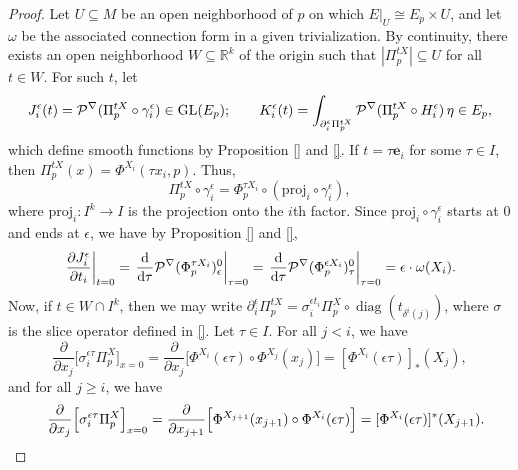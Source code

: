 \begin{proof}
  Let $U \subseteq M$ be an open neighborhood of $p$ on which $E|_U \cong E_p \times U$, and let $\omega$ be the associated connection form in a given trivialization. By continuity, there exists an open neighborhood $W \subseteq \mathbb{R}^k$ of the origin such that $|\Pi^{tX}_p| \subseteq U$ for all $t \in W$. For such $t$, let 
  \begin{equation}
  J_i^\epsilon(t) = \mathcal{P}^\nabla (\Pi^{tX}_p \circ \gamma_i^\epsilon) \in \operatorname{GL}(E_p); \quad \quad K_i^\epsilon(t) = \int_{\partial_i^\epsilon \Pi^{tX}_p} \mathcal{P}^\nabla(\Pi^{tX}_p \circ H_i^\epsilon)\, \eta \in E_p,
  \end{equation}
  which define smooth functions by Proposition \ref{} and \ref{}. If $t = \tau \mathbf{e}_i$ for some $\tau \in I$, then $\Pi^{tX}_p(x) = \Phi^{X_i}(\tau x_i, p)$. Thus,
  \begin{equation}
    \Pi^{tX}_p \circ \gamma_i^\epsilon = \Phi^{\tau X_i}_p \circ  (\mathrm{proj}_i \circ \gamma_i^\epsilon),
  \end{equation}
  where $\mathrm{proj}_i \colon I^k \to I$ is the projection onto the $i$th factor. Since $\mathrm{proj}_i \circ \gamma_i^\epsilon$ starts at $0$ and ends at $\epsilon$, we have by Proposition \ref{} and \ref{},
  \begin{equation}
    \left. \frac{\partial J_i^\epsilon}{\partial t_i} \right|_{t = 0} = \left.\frac{{\rm d}}{{\rm d} \tau} \mathcal{P}^\nabla(\Phi_p^{\tau X_i})_\epsilon^0 \right|_{\tau = 0} = \left.\frac{{\rm d}}{{\rm d} \tau} \mathcal{P}^\nabla(\Phi_p^{\epsilon X_i})_{\tau}^0 \right|_{\tau = 0} = \epsilon \cdot \omega(X_i).
  \end{equation}
  Now, if $t \in W \cap I^k$, then we may write $\partial_i^\epsilon \Pi^{tX}_p = \sigma_i^{\epsilon t_i} \Pi^X_p \circ \operatorname{diag}(t_{\delta^i(j)})$, where $\sigma$ is the slice operator defined in \eqref{}. Let $\tau \in I$. For all $j < i$, we have
  \begin{equation}
    \frac{\partial }{\partial x_j} \Big[ \sigma_i^{\epsilon\tau} \Pi^X_p \Big]_{x = 0} = \frac{\partial}{\partial x_j} \Big[\Phi^{X_i}(\epsilon\tau) \circ \Phi^{X_j}(x_j)\Big] = [\Phi^{X_i}(\epsilon\tau)]_*(X_j),
  \end{equation}
  and for all $j \geq i$, we have  
  \begin{equation}
    \mskip 16mu \frac{\partial }{\partial x_j} \Big[ \sigma_i^{\epsilon\tau} \Pi^X_p \Big]_{x = 0} = \frac{\partial}{\partial x_{j+1}} \Big[\Phi^{X_{j+1}}(x_{j+1}) \circ \Phi^{X_i}(\epsilon\tau)\Big] = [\Phi^{X_i}(\epsilon\tau)]^*(X_{j+1}).

\end{equation}
\end{proof}
